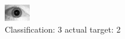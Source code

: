 \begin{figure}[h!]
\begin{center}
\includegraphics[width=0.60\columnwidth]{figures/ID1684_class_3_target_2.png}
\end{center}
\caption{ Classification: 3 actual target: 2}
\label{fig:ID1684_class_3_target_2}
\end{figure}
